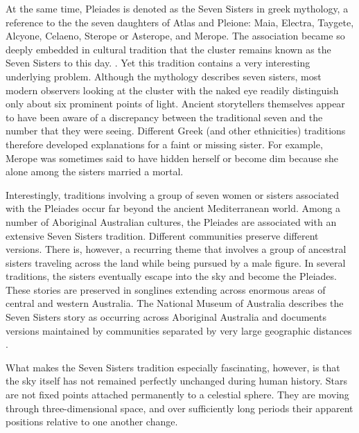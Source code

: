 \documentclass[11pt]{article}
\begin{document}
At the same time, Pleiades is denoted as the Seven Sisters in greek mythology, a reference to the
the seven daughters of Atlas and Pleione: Maia, Electra, Taygete, Alcyone,
Celaeno, Sterope or Asterope, and Merope. The association became so deeply embedded 
in cultural tradition that the cluster remains known as the Seven Sisters to this day. \cite{met-pleiades}.
Yet this tradition contains a very interesting underlying problem. Although the mythology
describes seven sisters, most modern observers looking at the cluster with the
naked eye readily distinguish only about six prominent points of light. Ancient
storytellers themselves appear to have been aware of a discrepancy between the
traditional seven and the number that they were seeing. Different Greek (and other ethnicities) traditions
therefore developed explanations for a faint or missing sister. For
example, Merope was sometimes said to have hidden herself or become dim because
she alone among the sisters married a mortal.


Interestingly, traditions involving a group of seven women or sisters
associated with the Pleiades occur far beyond the ancient Mediterranean world.
Among a number of Aboriginal Australian cultures, the Pleiades are associated
with an extensive Seven Sisters tradition. Different communities preserve
different versions. There is, however, a recurring theme that involves a group of ancestral sisters
traveling across the land while being pursued by a male figure. In several
traditions, the sisters eventually escape into the sky and become the Pleiades.
These stories are preserved in songlines extending across enormous areas of
central and western Australia. The National Museum of Australia describes the
Seven Sisters story as occurring across Aboriginal Australia and documents
versions maintained by communities separated by very large geographic distances
\cite{nma-sevensisters,nma-songlines}.


What makes the Seven Sisters tradition especially fascinating, however, is that
the sky itself has not remained perfectly unchanged during human history. Stars
are not fixed points attached permanently to a celestial sphere. They are
moving through three-dimensional space, and over sufficiently long periods
their apparent positions relative to one another change. 
\end{document}

